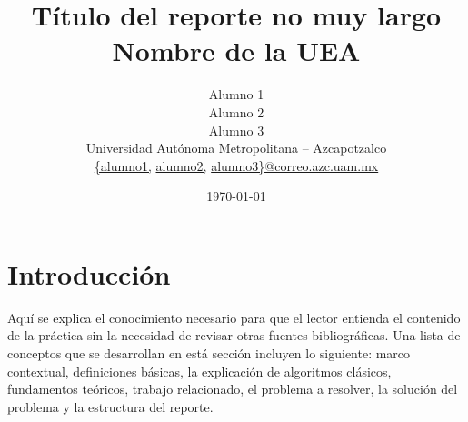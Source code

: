 \documentclass[10pt, twocolumn]{article}
\title{
   \textcolor{Xoc}{{\textbf Título del reporte no muy largo}}\\ %
   \textcolor{Wolf}{\large Nombre de la UEA} %
}
\author{Alumno 1\\ %
        Alumno 2\\
        Alumno 3\\
        Universidad Autónoma Metropolitana -- Azcapotzalco\\  %
        \href{mailto:alumno1@azc.uam.mx}{\{alumno1,}
        \href{mailto:alumno2@azc.uam.mx}{alumno2,}
        \href{mailto:alumno3@azc.uam.mx}{alumno3\}@correo.azc.uam.mx}
}
\date{\today} %
\begin{document}


\section{Introducción}

Aquí se explica el conocimiento necesario para que el lector entienda el contenido de la práctica sin la necesidad de revisar otras fuentes bibliográficas. Una lista de conceptos que se desarrollan en está sección incluyen lo siguiente: marco contextual, definiciones básicas, la explicación de algoritmos clásicos, fundamentos teóricos, trabajo relacionado, el problema a resolver, la solución del problema y la estructura del reporte.
\end{document}
